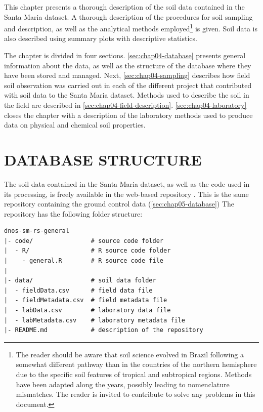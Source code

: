 \def\foottropics{\footnote{The reader should be aware that soil science evolved in Brazil following a somewhat 
different pathway than in the countries of the northern hemisphere due to the specific soil features of 
tropical and subtropical regions. Methods have been adapted along the years, possibly leading to nomenclature 
mismatches. The reader is invited to contribute to solve any problems in this document.}}

This chapter presents a thorough description of the soil data contained in the Santa Maria dataset. A 
thorough description of the procedures for soil sampling and description, as well as the analytical methods 
employed\foottropics{} is given. Soil data is also described using summary plots with descriptive statistics.

The chapter is divided in four sections. \autoref{sec:chap04-database} presents general information about 
the data, as well as the structure of the database where they have been stored and managed. Next, 
\autoref{sec:chap04-sampling} describes how field soil observation was carried out in each of the different 
project that contributed with soil data to the Santa Maria dataset. Methods used to describe the soil in the 
field are described in \autoref{sec:chap04-field-description}. \autoref{sec:chap04-laboratory} closes the 
chapter with a description of the laboratory methods used to produce data on physical and chemical soil 
properties.

\section{DATABASE STRUCTURE}
\label{sec:chap04-database}

The soil data contained in the Santa Maria dataset, as well as the code used in its processing, is freely 
available in the web-based \git{} repository \github{}. This is the same repository containing the ground 
control data (\autoref{sec:chap05-database}) The repository has the following folder structure:


\begin{verbatim}
dnos-sm-rs-general
|- code/                # source code folder
|  - R/                 # R source code folder
|    - general.R        # R source code file
|
|- data/                # soil data folder
|  - fieldData.csv      # field data file
|  - fieldMetadata.csv  # field metadata file
|  - labData.csv        # laboratory data file
|  - labMetadata.csv    # laboratory metadata file
|- README.md            # description of the repository
\end{verbatim}


